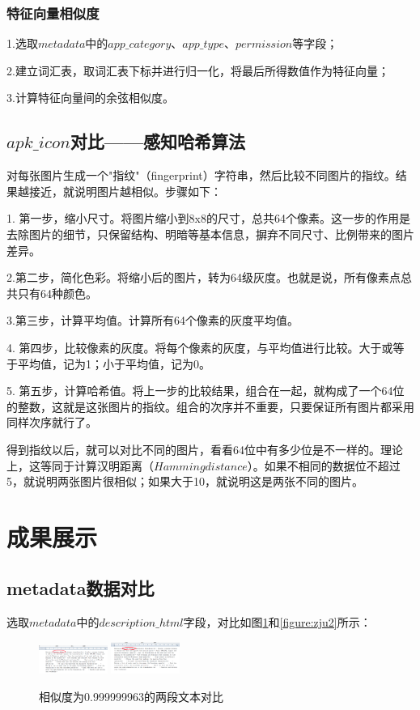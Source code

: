 \documentclass[UTF8,a4paper,10pt, twocolumn]{ctexart}
\begin{document}
\subsubsection{特征向量相似度}
1.选取$metadata$中的$app\_category$、$app\_type$、$permission$等字段；

2.建立词汇表，取词汇表下标并进行归一化，将最后所得数值作为特征向量；

3.计算特征向量间的余弦相似度。

\subsection{$apk\_icon$对比——感知哈希算法}
对每张图片生成一个"指纹"（fingerprint）字符串，然后比较不同图片的指纹。结果越接近，就说明图片越相似。步骤如下：

1. 第一步，缩小尺寸。将图片缩小到8x8的尺寸，总共64个像素。这一步的作用是去除图片的细节，只保留结构、明暗等基本信息，摒弃不同尺寸、比例带来的图片差异。

2.第二步，简化色彩。将缩小后的图片，转为64级灰度。也就是说，所有像素点总共只有64种颜色。

3.第三步，计算平均值。计算所有64个像素的灰度平均值。

4. 第四步，比较像素的灰度。将每个像素的灰度，与平均值进行比较。大于或等于平均值，记为1；小于平均值，记为0。

5. 第五步，计算哈希值。将上一步的比较结果，组合在一起，就构成了一个64位的整数，这就是这张图片的指纹。组合的次序并不重要，只要保证所有图片都采用同样次序就行了。

得到指纹以后，就可以对比不同的图片，看看64位中有多少位是不一样的。理论上，这等同于计算汉明距离（$Hamming distance$）。如果不相同的数据位不超过5，就说明两张图片很相似；如果大于10，就说明这是两张不同的图片。

\section{成果展示}
\subsection{metadata数据对比}
选取$metadata$中的$description\_html$字段，对比如图\ref{figure:zju1}和\ref{figure:zju2}所示：

\begin{figure}[htbp]
\centering
\includegraphics[width=0.2\textwidth]{img/fig1.png}
\includegraphics[width=0.2\textwidth]{img/fig2.png}
\caption{相似度为0.999999963的两段文本对比}
\label{figure:zju1}
\end{figure}
\end{document}
